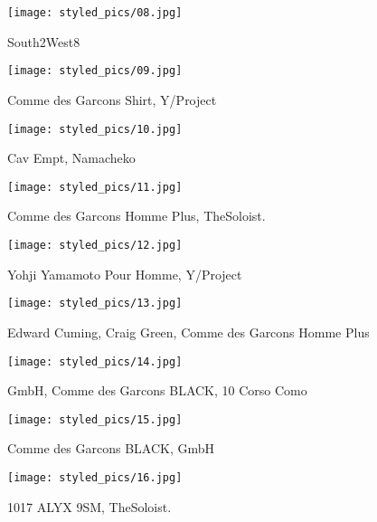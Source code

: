 \begin{minipage}[h!]{0.5\textwidth}
    \begin{figure}[H]
        \texttt{[image: styled\_pics/08.jpg]}
        \caption*{South2West8}
    \end{figure}
\end{minipage}
\begin{minipage}[h!]{0.5\textwidth}
    \begin{figure}[H]
        \texttt{[image: styled\_pics/09.jpg]}
        \caption*{Comme des Garcons Shirt, Y/Project}
    \end{figure}
\end{minipage}
\begin{minipage}[h!]{0.5\textwidth}
    \begin{figure}[H]
        \texttt{[image: styled\_pics/10.jpg]}
        \caption*{Cav Empt, Namacheko}
    \end{figure}
\end{minipage}
\begin{minipage}[h!]{0.5\textwidth}
    \begin{figure}[H]
        \texttt{[image: styled\_pics/11.jpg]}
        \caption*{Comme des Garcons Homme Plus, TheSoloist.}
    \end{figure}
\end{minipage}
\begin{minipage}[h!]{0.5\textwidth}
    \begin{figure}[H]
        \texttt{[image: styled\_pics/12.jpg]}
        \caption*{Yohji Yamamoto Pour Homme, Y/Project}
    \end{figure}
\end{minipage}
\begin{minipage}[h!]{0.5\textwidth}
    \begin{figure}[H]
        \texttt{[image: styled\_pics/13.jpg]}
        \caption*{Edward Cuming, Craig Green, Comme des Garcons Homme Plus}
    \end{figure}
\end{minipage}
\begin{minipage}[h!]{0.5\textwidth}
    \begin{figure}[H]
        \texttt{[image: styled\_pics/14.jpg]}
        \caption*{GmbH, Comme des Garcons BLACK, 10 Corso Como}
    \end{figure}
\end{minipage}
\begin{minipage}[h!]{0.5\textwidth}
    \begin{figure}[H]
        \texttt{[image: styled\_pics/15.jpg]}
        \caption*{Comme des Garcons BLACK, GmbH}
    \end{figure}
\end{minipage}
\begin{minipage}[h!]{0.5\textwidth}
    \begin{figure}[H]
        \texttt{[image: styled\_pics/16.jpg]}
        \caption*{1017 ALYX 9SM, TheSoloist.}
    \end{figure}
\end{minipage} 

